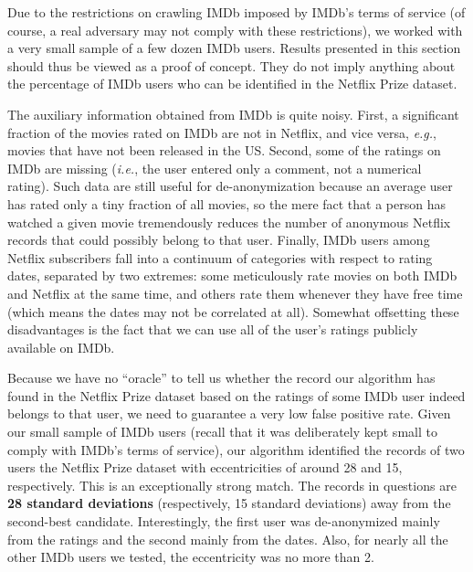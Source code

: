 \documentclass[11pt]{article}
\newcommand{\ie}{\emph{i.e.}}
\newcommand{\eg}{\emph{e.g.}}
\begin{document}

Due to the restrictions on crawling IMDb imposed by IMDb's terms
of service (of course, a real adversary may not comply with these
restrictions), we worked with a very small sample of a few dozen IMDb
users.  Results presented in this section should thus be viewed as a
proof of concept.  They do not imply anything about the percentage of
IMDb users who can be identified in the Netflix Prize dataset.

The auxiliary information obtained from IMDb is quite noisy.  First,
a significant fraction of the movies rated on IMDb are not in Netflix,
and vice versa, \eg, movies that have not been released in the US.
Second, some of the ratings on IMDb are missing (\ie, the user entered
only a comment, not a numerical rating).  Such data are still useful for
de-anonymization because an average user has rated only a tiny fraction
of all movies, so the mere fact that a person has watched a given
movie tremendously reduces the number of anonymous Netflix records that
could possibly belong to that user.  Finally, IMDb users among Netflix
subscribers fall into a continuum of categories with respect to rating
dates, separated by two extremes: some meticulously rate movies on both
IMDb and Netflix at the same time, and others rate them whenever they
have free time (which means the dates may not be correlated at all).
Somewhat offsetting these disadvantages is the fact that we can use all
of the user's ratings publicly available on IMDb.

Because we have no ``oracle'' to tell us whether the record our algorithm
has found in the Netflix Prize dataset based on the ratings of some IMDb
user indeed belongs to that user, we need to guarantee a very low false
positive rate.  Given our small sample of IMDb users (recall that it
was deliberately kept small to comply with IMDb's terms of service),
our algorithm identified the records of two users the Netflix Prize
dataset with eccentricities of around 28 and 15, respectively.  This is
an exceptionally strong match.  The records in questions are \textbf{28
standard deviations} (respectively, 15 standard deviations) away from the
second-best candidate.  Interestingly, the first user was de-anonymized
mainly from the ratings and the second mainly from the dates.  Also,
for nearly all the other IMDb users we tested, the eccentricity was no
more than 2.
\end{document}
